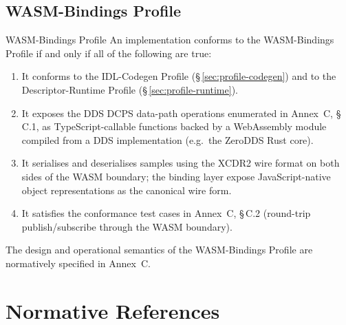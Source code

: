 \documentclass{../styles/zerodds-vendor-spec}
\begin{document}
\section{WASM-Bindings Profile}\label{sec:profile-wasm}

\begin{conformance}{WASM-Bindings Profile}
An implementation conforms to the WASM-Bindings Profile if and
only if all of the following are true:
\begin{enumerate}
  \item It conforms to the IDL-Codegen Profile
        (\S\,\ref{sec:profile-codegen}) and to the
        Descriptor-Runtime Profile
        (\S\,\ref{sec:profile-runtime}).
  \item It exposes the DDS DCPS data-path operations enumerated in
        Annex~C, \S\,C.1, as TypeScript-callable functions backed
        by a WebAssembly module compiled from a DDS implementation
        (e.g.\ the ZeroDDS Rust core).
  \item It serialises and deserialises samples using the XCDR2
        wire format on both sides of the WASM boundary; the binding
        layer  expose JavaScript-native object
        representations as the canonical wire form.
  \item It satisfies the conformance test cases in Annex~C,
        \S\,C.2 (round-trip publish/subscribe through the WASM
        boundary).
\end{enumerate}
\end{conformance}

The design and operational semantics of the WASM-Bindings Profile
are normatively specified in Annex~C.

\chapter{Normative References}\label{sec:ts-reference}
\end{document}
